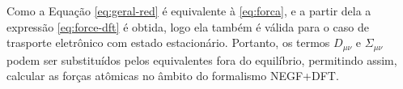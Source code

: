 Como a Equação \eqref{eq:geral-red} é equivalente à \eqref{eq:forca}, e a partir dela a expressão \eqref{eq:force-dft} é obtida, logo ela também é válida para o caso de trasporte eletrônico com estado estacionário. Portanto, os termos $ D_{\mu\nu} $ e $ \Sigma_{\mu\nu} $ podem ser substituídos pelos equivalentes fora do equilíbrio, permitindo assim, calcular as forças atômicas no âmbito do formalismo NEGF+DFT. \cite{force-teo4}


